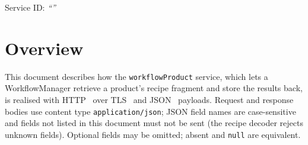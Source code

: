 \documentclass[a4paper]{arrowhead}
\begin{document}
\ArrowheadSetup

\begin{center}
  \vspace*{1cm}
  \huge{\arrowtitle}

  \vspace*{0.2cm}
  \LARGE{\arrowtype}
  \vspace*{1cm}

  \Large{Service ID: \textit{``\arrowid''}}
  \vspace*{\fill}

  

  \vspace*{1cm}
  \vspace*{\fill}

  \begin{abstract}
    This document describes the HTTP/TLS/JSON interface of the \texttt{workflowProduct} service of the Eclipse Arrowhead workflow support systems, service version 1.0.0, documentation edition 5.4.0. It realises the abstract operations of the \texttt{workflowProduct} SD.
  \end{abstract}

  \vspace*{1cm}
\end{center}

\newpage

\tableofcontents
\newpage

\section{Overview}
\label{sec:overview}
This document describes how the \texttt{workflowProduct} service, which lets a WorkflowManager retrieve a product's recipe fragment and store the results back, is realised with HTTP~\cite{rfc9110}
over TLS~\cite{rfc8446} and JSON~\cite{rfc8259} payloads. Request and response bodies use content type
\texttt{application/json}; JSON field names are case-sensitive and fields not listed in this document must not be sent
(the recipe decoder rejects unknown fields). Optional fields may be omitted; absent and \texttt{null} are equivalent.
\end{document}
